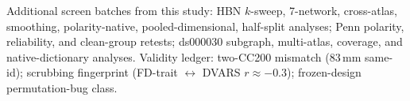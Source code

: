 \documentclass{article}
\begin{document}
Additional screen batches from this study: HBN $k$-sweep, 7-network, cross-atlas, smoothing, polarity-native, pooled-dimensional, half-split analyses; Penn polarity, reliability, and clean-group retests; ds000030 subgraph, multi-atlas, coverage, and native-dictionary analyses. Validity ledger: two-CC200 mismatch ($83$\,mm same-id); scrubbing fingerprint (FD-trait $\leftrightarrow$ DVARS $r{\approx}-0.3$); frozen-design permutation-bug class. 
\end{document}
